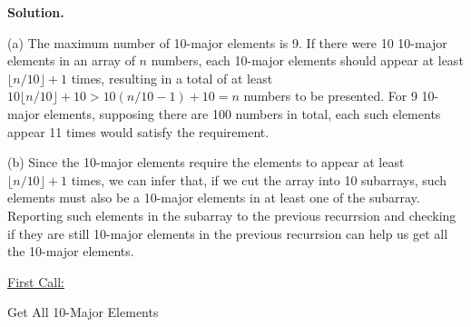 \documentclass[10pt]{article}
\begin{document}
\newpage

\textbf{Solution.}

(a) The maximum number of 10-major elements is 9. If there were 10 10-major elements in an array of $n$ numbers, each 10-major elements should appear at least $\lfloor n/10 \rfloor + 1$ times, resulting in a total of at least $10 \lfloor n/10 \rfloor + 10 > 10(n/10-1) + 10 = n$ numbers to be presented. For 9 10-major elements, supposing there are 100 numbers in total, each such elements appear 11 times would satisfy the requirement.

(b) Since the 10-major elements require the elements to appear at least $\lfloor n/10 \rfloor + 1$ times, we can infer that, if we cut the array into 10 subarrays, such elements must also be a 10-major elements in at least one of the subarray. Reporting such elements in the subarray to the previous recurrsion and checking if they are still 10-major elements in the previous recurrsion can help us get all the 10-major elements.

\begin{algorithm}
	\SetAlgoLined
	
	\underline{First Call:} 
	
	\caption{Get All 10-Major Elements}
\end{algorithm}
\end{document}
